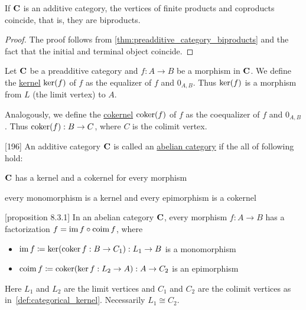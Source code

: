 \begin{theorem}\label{thm:additive_category_biproducts}
  If $\operatorname{\mathbf{C}}$ is an additive category, the vertices of finite products and coproducts coincide, that is, they are biproducts.
\end{theorem}
\begin{proof}
  The proof follows from \cref{thm:preadditive_category_biproducts} and the fact that the initial and terminal object coincide.
\end{proof}

\begin{definition}\label{def:categorical_kernel}
  Let $\operatorname{\mathbf{C}}$ be a preadditive category and $f: A \to B$ be a morphism in $\operatorname{\mathbf{C}}$. We define the \uline{kernel} $\operatorname{ker}(f)$ of $f$ as the equalizer of $f$ and $0_{A,B}$. Thus $\operatorname{ker}(f)$ is a morphism from $L$ (the limit vertex) to $A$.

  Analogously, we define the \uline{cokernel} $\operatorname{coker}(f)$ of $f$ as the coequalizer of $f$ and $0_{A,B}$. Thus $\operatorname{coker}(f): B \to C$, where $C$ is the colimit vertex.
\end{definition}

\begin{definition}\label{def:abelian_category}\cite{MacLane1994}[196]
  An additive category $\operatorname{\mathbf{C}}$ is called an \uline{abelian category} if the all of following hold:
  \begin{defenum}
    \item $\operatorname{\mathbf{C}}$ has a kernel and a cokernel for every morphism
    \item every monomorphism is a kernel and every epimorphism is a cokernel
  \end{defenum}
\end{definition}

\begin{proposition}\label{def:abelian_category_morphism_factorization}\cite{MacLane1994}[proposition 8.3.1]
  In an abelian category $\operatorname{\mathbf{C}}$, every morphism $f: A \to B$ has a factorization $f = \operatorname{im} f \circ \operatorname{coim} f$, where
  \begin{itemize}
    \item $\operatorname{im} f \coloneqq \operatorname{ker}(\operatorname{coker} f: B \to C_1): L_1 \to B$ is a monomorphism
    \item $\operatorname{coim} f \coloneqq \operatorname{coker}(\operatorname{ker} f: L_2 \to A): A \to C_2$ is an epimorphism
  \end{itemize}
  Here $L_1$ and $L_2$ are the limit vertices and $C_1$ and $C_2$ are the colimit vertices as in~\cref{def:categorical_kernel}. Necessarily $L_1 \cong C_2$.
\end{proposition}

